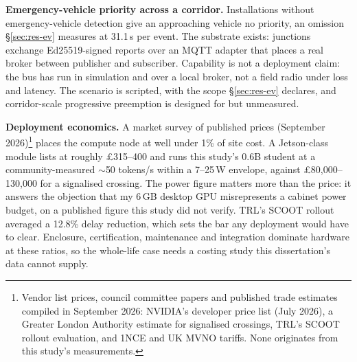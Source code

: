 \textbf{Emergency-vehicle priority across a corridor.} Installations
without emergency-vehicle detection give an approaching vehicle no
priority, an omission \S\ref{sec:res-ev} measures at 31.1\,s per event.
The substrate exists: junctions exchange Ed25519-signed
reports over an MQTT adapter that places a real broker between publisher
and subscriber. Capability is not a deployment claim: the bus has run in
simulation and over a local broker, not a field radio under loss and
latency. The scenario is scripted, with the scope \S\ref{sec:res-ev}
declares, and corridor-scale progressive preemption is designed for but
unmeasured.

\textbf{Deployment economics.} A market survey of published prices
(September 2026)\footnote{Vendor list prices, council committee papers and
published trade estimates compiled in September 2026: NVIDIA's developer
price list (July 2026), a Greater London Authority estimate for signalised
crossings, TRL's SCOOT rollout evaluation, and 1NCE and UK MVNO tariffs.
None originates from this study's measurements.} places the compute node
at well under 1\% of site cost. A Jetson-class module lists at roughly
\pounds315--400 and runs this study's 0.6B student at a community-measured
$\sim$50 tokens/s within a 7--25\,W envelope, against
\pounds80,000--130,000 for a signalised crossing. The power figure matters
more than the price: it answers the objection that my 6\,GB desktop GPU
misrepresents a cabinet power budget, on a published figure this study did
not verify. TRL's SCOOT rollout averaged a 12.8\%
delay reduction, which sets the bar any deployment would have to clear.
Enclosure, certification, maintenance and integration dominate hardware at
these ratios, so the whole-life case needs a costing study this
dissertation's data cannot supply.
